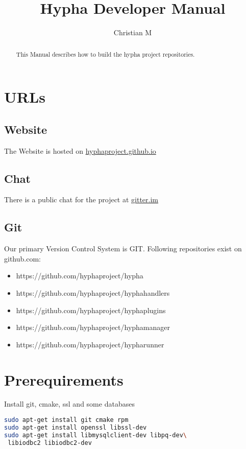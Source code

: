\documentclass[english,a4paper,11pt]{report}
\title{Hypha Developer Manual}
\author{Christian M}
\begin{document}
\maketitle

\begin{abstract}
	This Manual describes how to build the hypha project repositories.
\end{abstract}

\chapter{URLs}

\section{Website}
The Website is hosted on 
\href{https://hyphaproject.github.io/}{hyphaproject.github.io}

\section{Chat}
There is a public chat for the project at 
\href{https://gitter.im/hyphaproject/public}{gitter.im}

\section{Git}
Our primary Version Control System is GIT.
Following repositories exist on github.com:
\begin{itemize}
	\item https://github.com/hyphaproject/hypha
	\item https://github.com/hyphaproject/hyphahandlers
	\item https://github.com/hyphaproject/hyphaplugins
	\item https://github.com/hyphaproject/hyphamanager
	\item https://github.com/hyphaproject/hypharunner
\end{itemize}

\chapter{Prerequirements}
Install git, cmake, ssl and some databases
\begin{lstlisting}[language=bash,caption={prerequirements}]
sudo apt-get install git cmake rpm
sudo apt-get install openssl libssl-dev
sudo apt-get install libmysqlclient-dev libpq-dev\
 libiodbc2 libiodbc2-dev
\end{lstlisting}
\end{document}
